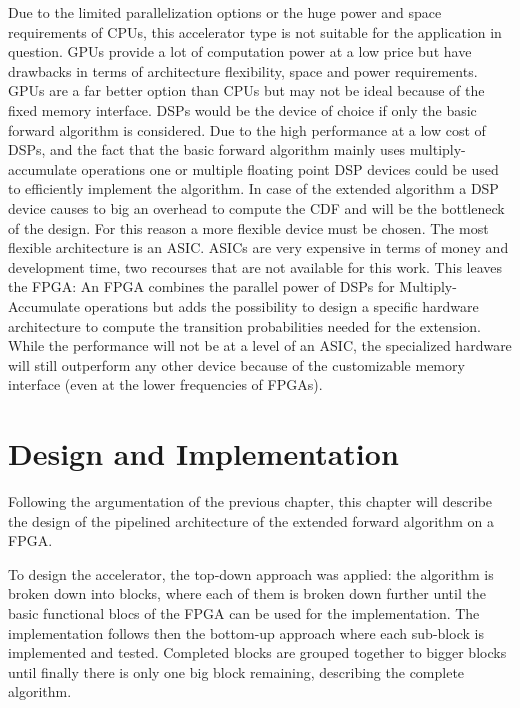 \documentclass[mscthesis]{usiinfthesis}
\begin{document}
Due to the limited parallelization options or the huge power and space
requirements of CPUs, this accelerator type is not suitable for the application
in question. GPUs provide a lot of computation power at a low price but have
drawbacks in terms of architecture flexibility, space and power requirements.
GPUs are a far better option than CPUs but may not be ideal because of the
fixed memory interface. DSPs would be the device of choice if only the basic
forward algorithm is considered. Due to the high performance at a low cost of
DSPs, and the fact that the basic forward algorithm mainly uses
multiply-accumulate operations one or multiple floating point DSP devices could
be used to efficiently implement the algorithm. In case of the extended
algorithm a DSP device causes to big an overhead to compute the CDF and will be
the bottleneck of the design. For this reason a more flexible device must be
chosen.  The most flexible architecture is an ASIC. ASICs are very expensive in
terms of money and development time, two recourses that are not available for
this work. This leaves the FPGA: An FPGA combines the parallel power of DSPs
for Multiply-Accumulate operations but adds the possibility to design
a specific hardware architecture to compute the transition probabilities needed
for the extension. While the performance will not be at a level of an ASIC, the
specialized hardware will still outperform any other device because of the
customizable memory interface (even at the lower frequencies of FPGAs).

\chapter{Design and Implementation}
\label{ch:design}

Following the argumentation of the previous chapter, this chapter will describe
the design of the pipelined architecture of the extended forward algorithm on
a FPGA.

To design the accelerator, the top-down approach was applied: the algorithm is
broken down into blocks, where each of them is broken down further until the
basic functional blocs of the FPGA can be used for the implementation. The
implementation follows then the bottom-up approach where each sub-block is
implemented and tested. Completed blocks are grouped together to bigger blocks
until finally there is only one big block remaining, describing the complete
algorithm.
\end{document}
